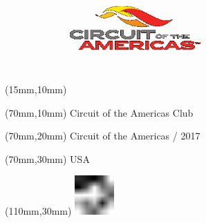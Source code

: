 \null\newpage
\begin{textblock*}{50mm}(15mm,10mm)%
\includegraphics[width=50mm]{LG/CIR.png}
\end{textblock*}
\begin{textblock*}{130mm}(70mm,10mm)%
{\fontsize{20}{20}\selectfont Circuit of the Americas Club}\\
\end{textblock*}
\begin{textblock*}{120mm}(70mm,20mm)%
{\fontsize{16}{16}\selectfont Circuit of the Americas / 2017}\\
\end{textblock*}
\begin{textblock*}{120mm}(70mm,30mm)%
{\fontsize{12}{12}\selectfont USA}
\end{textblock*}
\begin{textblock*}{30mm}(110mm,30mm)%
\centering
\includegraphics[height=15mm]{icons/fa-rotate-left.pdf}
\end{textblock*}
